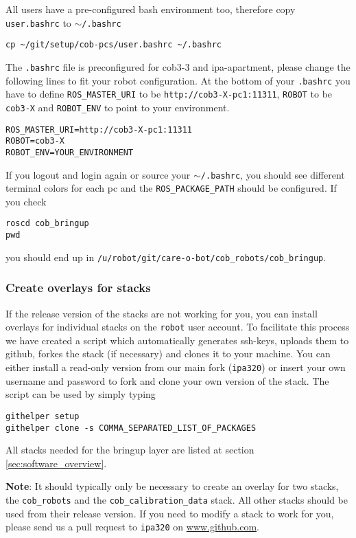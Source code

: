All users have a pre-configured bash environment too, therefore copy \texttt{user.bashrc} to \texttt{$\sim$/.bashrc}
\begin{lstlisting}
cp ~/git/setup/cob-pcs/user.bashrc ~/.bashrc
\end{lstlisting}
The \texttt{.bashrc} file is preconfigured for cob3-3 and ipa-apartment, please change the following lines to fit your robot configuration. At the bottom of your \texttt{.bashrc} you have to define \texttt{ROS\_MASTER\_URI} to be \texttt{http://cob3-X-pc1:11311}, \texttt{ROBOT} to be \texttt{cob3-X} and \texttt{ROBOT\_ENV} to point to your environment.
\begin{lstlisting}
ROS_MASTER_URI=http://cob3-X-pc1:11311
ROBOT=cob3-X
ROBOT_ENV=YOUR_ENVIRONMENT
\end{lstlisting}

If you logout and login again or source your \texttt{$\sim$/.bashrc}, you should see different terminal colors for each pc and the \texttt{ROS\_PACKAGE\_PATH} should be configured. If you check 
\begin{lstlisting}
roscd cob_bringup
pwd
\end{lstlisting}
you should end up in \texttt{/u/robot/git/care-o-bot/cob\_robots/cob\_bringup}.

\subsubsection{Create overlays for stacks}
If the release version of the stacks are not working for you, you can install overlays for individual stacks on the \texttt{robot} user account. To facilitate this process we have created a script which automatically generates ssh-keys, uploads them to github, forkes the stack (if necessary) and clones it to your machine. You can either install a read-only version from our main fork (\texttt{ipa320}) or insert your own username and password to fork and clone your own version of the stack. The script can be used by simply typing
\begin{lstlisting}
githelper setup
githelper clone -s COMMA_SEPARATED_LIST_OF_PACKAGES
\end{lstlisting}

All stacks needed for the bringup layer are listed at section \ref{sec:software_overview}. 

\textbf{Note}: It should typically only be necessary to create an overlay for two stacks, the \texttt{cob\_robots} and the \texttt{cob\_calibration\_data} stack. All other stacks should be used from their release version. If you need to modify a stack to work for you, please send us a pull request to \texttt{ipa320} on \url{www.github.com}.


